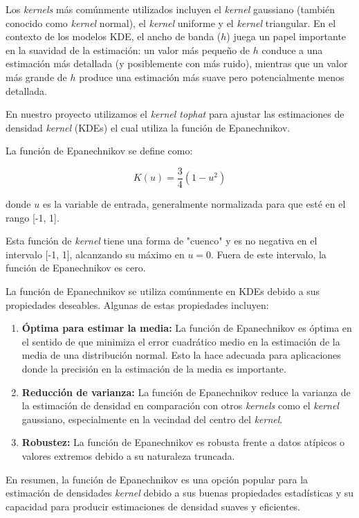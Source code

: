 \documentclass[12pt]{article}
\begin{document}
Los \textit{kernels} más comúnmente utilizados incluyen el \textit{kernel} gaussiano (también conocido como \textit{kernel} normal), el \textit{kernel} uniforme y el \textit{kernel} triangular. En el contexto de los modelos KDE, el ancho de banda (\( h \)) juega un papel importante en la suavidad de la estimación: un valor más pequeño de \( h \) conduce a una estimación más detallada (y posiblemente con más ruido), mientras que un valor más grande de \( h \) produce una estimación más suave pero potencialmente menos detallada.

En nuestro proyecto utilizamos el \textit{kernel tophat} para ajustar las estimaciones de densidad \textit{kernel} (KDEs) el cual utiliza la función de Epanechnikov.

La función de Epanechnikov se define como:

\[ K(u) = \frac{3}{4}(1 - u^2) \]

donde \( u \) es la variable de entrada, generalmente normalizada para que esté en el rango [-1, 1].

Esta función de \textit{kernel} tiene una forma de "cuenco" y es no negativa en el intervalo [-1, 1], alcanzando su máximo en \( u = 0 \). Fuera de este intervalo, la función de Epanechnikov es cero.

La función de Epanechnikov se utiliza comúnmente en KDEs debido a sus propiedades deseables. Algunas de estas propiedades incluyen:

\begin{enumerate}
    \item \textbf{Óptima para estimar la media:} La función de Epanechnikov es óptima en el sentido de que minimiza el error cuadrático medio en la estimación de la media de una distribución normal. Esto la hace adecuada para aplicaciones donde la precisión en la estimación de la media es importante.
    \item \textbf{Reducción de varianza:} La función de Epanechnikov reduce la varianza de la estimación de densidad en comparación con otros \textit{kernels} como el \textit{kernel} gaussiano, especialmente en la vecindad del centro del \textit{kernel}.
    \item \textbf{Robustez:} La función de Epanechnikov es robusta frente a datos atípicos o valores extremos debido a su naturaleza truncada.
\end{enumerate}

En resumen, la función de Epanechnikov es una opción popular para la estimación de densidades \textit{kernel} debido a sus buenas propiedades estadísticas y su capacidad para producir estimaciones de densidad suaves y eficientes.
\end{document}

